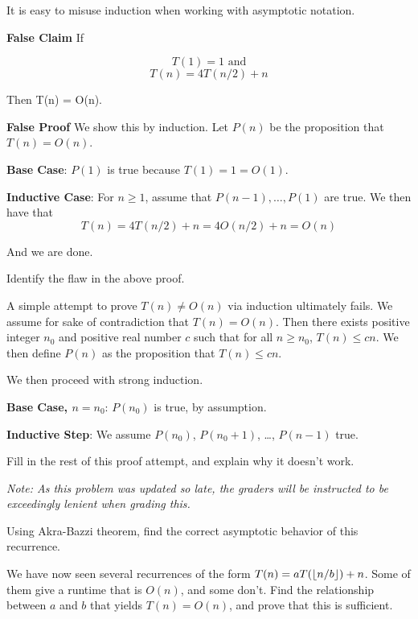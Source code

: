 \documentclass[12pt,twoside]{article}
\begin{document}
\begin{problem}{30}
It is easy to misuse induction when working with asymptotic notation.

\textbf{False Claim}  If

$$T(1) = 1 \textrm{ and}$$
$$T(n) = 4T(n/2) + n$$

Then T(n) = O(n).

\textbf{False Proof}
We show this by induction.  Let $P(n)$ be the proposition that $T(n) = O(n)$.  

\textbf{Base Case}:
$P(1)$ is true because $T(1) = 1 = O(1)$. 

\textbf{Inductive Case}: 
For $n \geq 1$, assume that $P(n-1), \ldots, P(1)$ are true.  We then have that
$$T(n) = 4T(n/2) + n = 4O(n/2) + n = O(n)$$

And we are done.

\bparts
	 Identify the flaw in the above proof.  
	
	 A simple attempt to prove $T(n) \neq O(n)$ via induction ultimately fails. We assume for sake of contradiction that $T(n) = O(n)$. Then there exists positive integer $n_0$ and positive real number $c$ such that for all $n \geq n_0$, $T(n) \leq cn$. We then define $P(n)$ as the proposition that $T(n) \leq cn$.

	We then proceed with strong induction.

	\textbf{Base Case, $n=n_0$}: $P(n_0)$ is true, by assumption.

	\textbf{Inductive Step}: We assume $P(n_0)$, $P(n_0 + 1)$, \ldots, $P(n-1)$ true.

	Fill in the rest of this proof attempt, and explain why it doesn't work.

	\textit{Note: As this problem was updated so late, the graders will be instructed to be exceedingly lenient when grading this.}
	
	 Using Akra-Bazzi theorem, find the correct asymptotic behavior of this recurrence.
	
	 We have now seen several recurrences of the form $T(n) = aT(\left\lfloor n/b\right\rfloor) + n$.  Some of them give a runtime that is $O(n)$, and some don't.  Find the relationship
	between $a$ and $b$ that yields $T(n) = O(n)$, and prove that this is sufficient.
	
\eparts
\end{problem}
\end{document}
